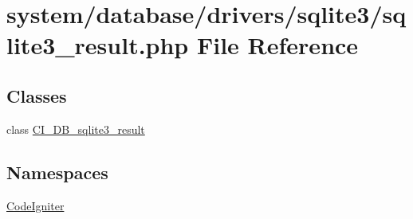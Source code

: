 \hypertarget{sqlite3__result_8php}{}\section{system/database/drivers/sqlite3/sqlite3\+\_\+result.php File Reference}
\label{sqlite3__result_8php}
\subsection*{Classes}
\begin{DoxyCompactItemize}
\item 
class \mbox{\hyperlink{class_c_i___d_b__sqlite3__result}{C\+I\+\_\+\+D\+B\+\_\+sqlite3\+\_\+result}}
\end{DoxyCompactItemize}
\subsection*{Namespaces}
\begin{DoxyCompactItemize}
\item 
 \mbox{\hyperlink{namespace_code_igniter}{Code\+Igniter}}
\end{DoxyCompactItemize}
